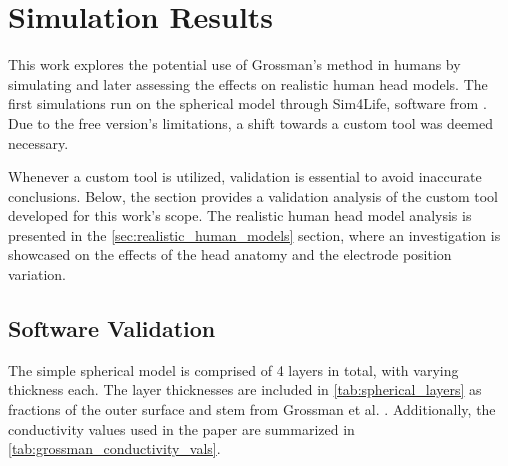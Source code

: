 \pagebreak
\chapter{Simulation Results}



This work explores the potential use of Grossman's \cite{Grossman2017} method in humans by simulating and later assessing the effects on realistic human head models. The first simulations run on the spherical model through Sim4Life, software from . Due to the free version's limitations, a shift towards a custom tool was deemed necessary.

Whenever a custom tool is utilized, validation is essential to avoid inaccurate conclusions. Below, the  section provides a validation analysis of the custom tool developed for this work's scope. The realistic human head model analysis is presented in the \autoref{sec:realistic_human_models} section, where an investigation is showcased on the effects of the head anatomy and the electrode position variation.

\section{Software Validation}
\label{sec:soft_validation}

The simple spherical model is comprised of 4 layers in total, with varying thickness each. The layer thicknesses are included in \autoref{tab:spherical_layers} as fractions of the outer surface and stem from Grossman et al. \cite[Figure S2, J, and K]{Grossman2017}. Additionally, the conductivity values used in the paper are summarized in \autoref{tab:grossman_conductivity_vals}.

